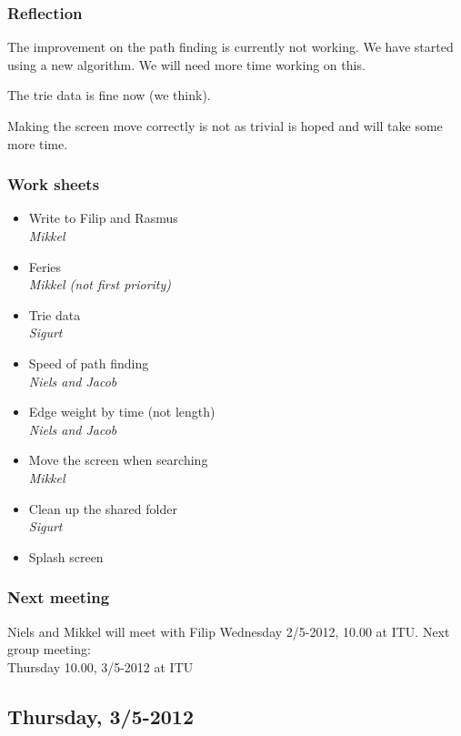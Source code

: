 \documentclass[a4paper,11pt]{article}
\begin{document}
\subsubsection*{Reflection}
The improvement on the path finding is currently not working. We have started using a new algorithm. We will need more time working on this.

The trie data is fine now (we think).

Making the screen move correctly is not as trivial is hoped and will take some more time.

\subsubsection*{Work sheets}
\begin{itemize}
	\item Write to Filip and Rasmus \\
		\textsl{Mikkel}
	\item Feries \\
		\textsl{Mikkel (not first priority)}
	\item Trie data \\
		\textsl{Sigurt}
	\item Speed of path finding \\
		\textsl{Niels and Jacob}
	\item Edge weight by time (not length) \\
		\textsl{Niels and Jacob}
	\item Move the screen when searching \\
		\textsl{Mikkel}
	\item Clean up the shared folder \\
		\textsl{Sigurt}
	\item Splash screen
\end{itemize}

\subsubsection*{Next meeting}
Niels and Mikkel will meet with Filip Wednesday 2/5-2012, 10.00 at ITU.
Next group meeting: \\
Thursday 10.00, 3/5-2012 at ITU


\pagebreak
\subsection{Thursday, 3/5-2012}
\end{document}
